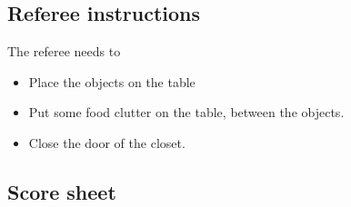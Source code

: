 \subsection{Referee instructions}

The referee needs to
\begin{itemize}
\item Place the objects on the table
\item Put some food clutter on the table, between the objects. 
\item Close the door of the closet. 
\end{itemize}

\subsection{Score sheet}
